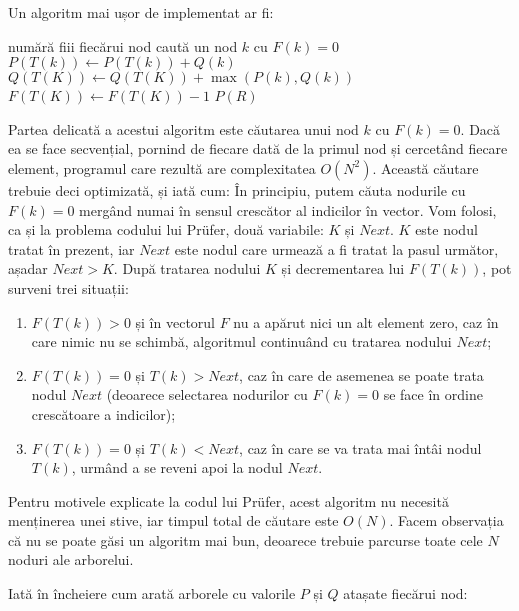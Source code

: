Un algoritm mai ușor de implementat ar fi:

\vspace{\algskip}
\begin{algorithmic}[1]
  \STATE numără fiii fiecărui nod
  \STATE caută un nod $k$ cu $F(k)=0$
  \STATE $P(T(k)) \leftarrow P(T(k))+Q(k)$
  \STATE $Q(T(K)) \leftarrow Q(T(K))+\max(P(k),Q(k))$
  \STATE $F(T(K)) \leftarrow F(T(K))-1$
  \ENDFOR
  \PRINT $P(R)$
\end{algorithmic}

Partea delicată a acestui algoritm este căutarea unui nod $k$ cu
$F(k)=0$. Dacă ea se face secvențial, pornind de fiecare dată de la primul nod
și cercetând fiecare element, programul care rezultă are complexitatea
$O(N^2)$. Această căutare trebuie deci optimizată, și iată cum: În principiu,
putem căuta nodurile cu $F(k)=0$ mergând numai în sensul crescător al
indicilor în vector. Vom folosi, ca și la problema codului lui Prüfer, două
variabile: $K$ și $Next$. $K$ este nodul tratat în prezent, iar $Next$ este
nodul care urmează a fi tratat la pasul următor, așadar $Next > K$. După
tratarea nodului $K$ și decrementarea lui $F(T(k))$, pot surveni trei
situații:

\begin{enumerate}

\item $F(T(k))>0$ și în vectorul $F$ nu a apărut nici un alt element zero, caz
  în care nimic nu se schimbă, algoritmul continuând cu tratarea nodului
  $Next$;

\item $F(T(k))=0$ și $T(k)>Next$, caz în care de asemenea se poate trata nodul
  $Next$ (deoarece selectarea nodurilor cu $F(k)=0$ se face în ordine
  crescătoare a indicilor);

\item $F(T(k))=0$ și $T(k)<Next$, caz în care se va trata mai întâi nodul
  $T(k)$, urmând a se reveni apoi la nodul $Next$.

\end{enumerate}

Pentru motivele explicate la codul lui Prüfer, acest algoritm nu necesită
menținerea unei stive, iar timpul total de căutare este $O(N)$. Facem
observația că nu se poate găsi un algoritm mai bun, deoarece trebuie parcurse
toate cele $N$ noduri ale arborelui.

Iată în încheiere cum arată arborele cu valorile $P$ și $Q$ atașate fiecărui
nod:

